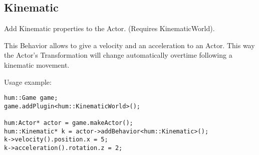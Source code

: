 \subsection{Kinematic}
Add Kinematic properties to the Actor. (Requires KinematicWorld).

This Behavior allows to give a velocity and an acceleration to an Actor. This way
the Actor's Transformation will change automatically overtime following a
kinematic movement.

Usage example:
\begin{lstlisting}[caption=Kinematic example]
hum::Game game;
game.addPlugin<hum::KinematicWorld>();

hum:Actor* actor = game.makeActor();
hum::Kinematic* k = actor->addBehavior<hum::Kinematic>();
k->velocity().position.x = 5;
k->acceleration().rotation.z = 2;
\end{lstlisting}

